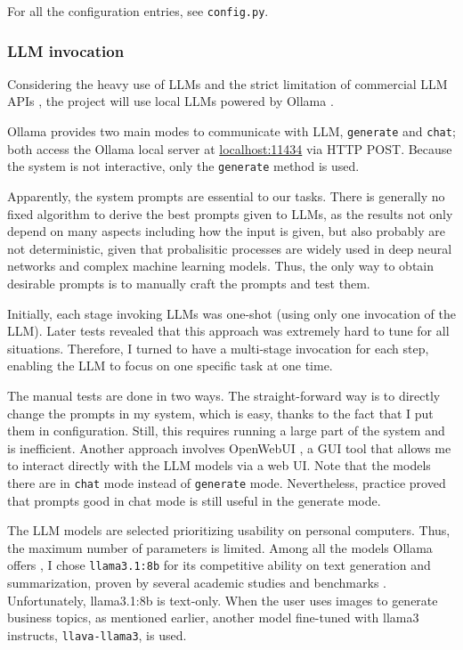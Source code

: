 \documentclass[final-report]{report-template}
\begin{document}
For all the configuration entries, see \texttt{config.py}.

\subsubsection{LLM invocation}
Considering the heavy use of LLMs and the strict limitation of commercial LLM
APIs \cite{openai.api.limit, anthropic.api.limit}, the project will use local
LLMs powered by Ollama \cite{ollama}.

Ollama provides two main modes to communicate with LLM, \texttt{generate} and
\texttt{chat}; both access the Ollama local server at \url{localhost:11434} via
HTTP POST. Because the system is not interactive, only the \texttt{generate}
method is used.

Apparently, the system prompts are essential to our tasks. There is
generally no fixed algorithm to derive the best prompts given to LLMs, as
the results not only depend on many aspects including how the input is
given, but also probably are not deterministic, given that probalisitic
processes are widely used in deep neural networks and complex machine learning
models. Thus, the only way to obtain desirable prompts is to manually craft the
prompts and test them.

Initially, each stage invoking LLMs was one-shot (using only one invocation of
the LLM). Later tests revealed that this approach was extremely hard to tune
for all situations. Therefore, I turned to have a multi-stage invocation for
each step, enabling the LLM to focus on one specific task at one time.

The manual tests are done in two ways. The straight-forward way is to directly
change the prompts in my system, which is easy, thanks to the fact that I
put them in configuration. Still, this requires running a large part of the
system and is inefficient. Another approach involves OpenWebUI
\cite{open.webui}, a GUI tool that allows me to interact directly with the LLM
models via a web UI. Note that the models  there are in \texttt{chat} mode
instead of \texttt{generate} mode. Nevertheless, practice proved that prompts
good in chat mode is still useful in the generate mode.

The LLM models are selected prioritizing usability on personal computers. Thus,
the maximum number of parameters is limited. Among all the models Ollama offers
\cite{ollama.models}, I chose \texttt{llama3.1:8b} for its competitive ability
on text generation and summarization, proven by several academic studies and
benchmarks \cite{llama3.1.bench.1, llama3.1.bench.2, llama3.1.bench.3}.
Unfortunately, llama3.1:8b is text-only. When the user uses images to generate
business topics, as mentioned earlier, another model fine-tuned with llama3
instructs, \texttt{llava-llama3}, is used.
\end{document}
